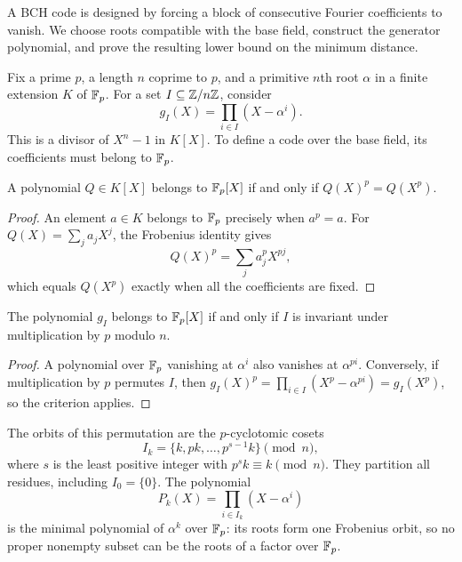 A BCH code is designed by forcing a block of consecutive Fourier
coefficients to vanish. We choose roots compatible with the base field,
construct the generator polynomial, and prove the resulting lower bound on
the minimum distance.

Fix a prime $p$, a length $n$ coprime to $p$, and a primitive $n$th root
$\alpha$ in a finite extension $K$ of $\mathbb{F}_p$. For a set
$I\subseteq\mathbb{Z}/n\mathbb{Z}$, consider
\begin{equation}
\label{eq-defn-pol-gen-codes-bch}
 g_I(X)=\prod_{i\in I}(X-\alpha^i).
\end{equation}
This is a divisor of $X^n-1$ in $K[X]$. To define a code over the base
field, its coefficients must belong to $\mathbb{F}_p$.


\begin{lem}
A polynomial $Q\in K[X]$ belongs to $\mathbb{F}_p[X]$ if and only if
$Q(X)^p=Q(X^p)$.
\end{lem}
\begin{proof}
An element $a\in K$ belongs to $\mathbb{F}_p$ precisely when $a^p=a$.
For $Q(X)=\sum_j a_jX^j$, the Frobenius identity gives
\begin{equation}
\label{eq-condition-membership-fp}
 Q(X)^p=\sum_j a_j^p X^{pj},
\end{equation}
which equals $Q(X^p)$ exactly when all the coefficients are fixed.
\end{proof}


\begin{prop}
\label{prop-cns-cyclotomic-class}
The polynomial $g_I$ belongs to $\mathbb{F}_p[X]$ if and only if $I$ is invariant
under multiplication by $p$ modulo $n$.
\end{prop}
\begin{proof}
A polynomial over $\mathbb{F}_p$ vanishing at $\alpha^i$ also vanishes at
$\alpha^{pi}$. Conversely, if multiplication by $p$ permutes $I$, then
$g_I(X)^p=\prod_{i\in I}(X^p-\alpha^{pi})=g_I(X^p)$, so the criterion applies.
\end{proof}

The orbits of this permutation are the $p$-cyclotomic cosets
\begin{equation}
\label{eq-defn-pol-cyclotomic-classes}
 I_k=\{k,pk,\ldots,p^{s-1}k\}\pmod n,
\end{equation}
where $s$ is the least positive integer with $p^sk\equiv k\pmod n$.
They partition all residues, including $I_0=\{0\}$. The polynomial
\begin{equation}
\label{defn-pol-classes-cyclo-codes-bch}
 P_k(X)=\prod_{i\in I_k}(X-\alpha^i)
\end{equation}
is the minimal polynomial of $\alpha^k$ over $\mathbb{F}_p$: its roots form one
Frobenius orbit, so no proper nonempty subset can be the roots of a factor
over $\mathbb{F}_p$.

